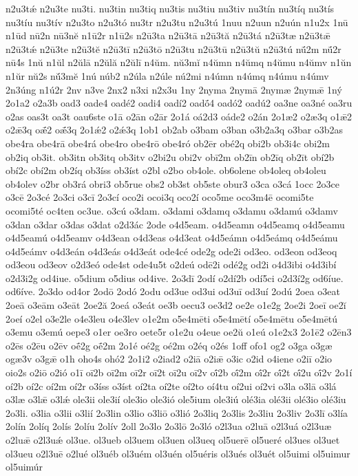 {n2u3tǽ
n2u3te
nu3ti.
nu3tin
nu3tiq
nu3tis
nu3tiu
nu3tiv
nu3tín
nu3tíq
nu3tís
nu3tíu
nu3tív
n2u3to
n2u3tó
nu3tr
n2u3tu
n2u3tú
1nuu
n2uun
n2uún
n1u2x
1nū
n1ūd
nū2n
nū3nĕ
n1ū2r
n1ū2s
n2ū3ta
n2ū3tā
n2ū3tă
n2ū3tá
n2ū3tæ
n2ū3tǣ
n2ū3tǽ
n2ū3te
n2ū3tĕ
n2ū3tī
n2ū3tō
n2ū3tu
n2ū3tū
n2ū3tŭ
n2ū3tú
nū́2m
nū́2r
nū4́s
1nŭ
n1ŭl
n2ŭlā
n2ŭlă
n2ŭlī
n4ŭm.
nŭ3mĭ
n4ŭmn
n4ŭmq
n4ŭmu
n4ŭmv
n1ŭn
n1ŭr
nŭ2s
nŭ́3mĕ
1nú
núb2
n2úla
n2úle
nú2mi
n4úmn
n4úmq
n4úmu
n4úmv
2n3úng
n1ú2r
2nv
n3ve
2nx2
n3xi
n2x3u
1ny
2nyma
2nymā
2nymæ
2nymǣ
1ný
2o1a2
o2a3b
oad3
oade4
oadé2
oadi4
oadí2
oadṓ4
oadó2
oadú2
oa3ne
oa3né
oa3ru
o2as
oas3t
oa3t
oau6ste
o1ā
o2ān
o2ār
2o1á
oá2d3
oáde2
o2án
2o1æ2
o2æ3q
o1ǣ2
o2ǣ3q
oǣ́2
oǣ́3q
2o1ǽ2
o2ǽ3q
1ob1
ob2ab
o3bam
o3ban
o3b2a3q
o3bar
o3b2as
obe4ra
obe4rā
obe4rá
obe4ro
obe4rō
obe4ró
ob2ēr
obé2q
obi2b
ob3i4c
obi2m
ob2iq
ob3it.
ob3itn
ob3itq
ob3itv
o2bi2u
obi2v
obī2m
ob2īn
ob2īq
ob2īt
obí2b
obí2c
obí2m
ob2íq
ob3íss
ob3íst
o2bl
o2bo
ob4ole.
ob6olene
ob4oleq
ob4oleu
ob4olev
o2br
ob3rá
obri3
ob5rue
obs2
ob3st
ob5ste
obur3
o3ca
o3cá
1occ
2o3ce
o3cē
2o3cé
2o3ci
o3cī
2o3cí
oco2i
ocoi3q
oco2í
oco5me
oco3m4ē
ocomi5te
ocomi5té
oc4ten
oc3ue.
o3cú
o3dam.
o3dami
o3damq
o3damu
o3damú
o3damv
o3dan
o3dar
o3das
o3dat
o2d3ác
2ode
o4d5eam.
o4d5eamn
o4d5eamq
o4d5eamu
o4d5eamú
o4d5eamv
o4d3ean
o4d3eas
o4d3eat
o4d5eámn
o4d5eámq
o4d5eámu
o4d5eámv
o4d3eán
o4d3eás
o4d3eát
ode4cé
ode2g
ode2i
od3eo.
od3eon
od3eoq
od3eou
od3eov
o2d3eó
ode4st
ode4u5t
o2deú
odē2i
odé2g
od2i
o4d3ibi
o4d3ibí
o2d3i2g
od4iue.
o5dium
o5dius
od4ive.
2o3dī
2odí
o2dí2b
odí5ci
o2d3í2g
od6íue.
od6íve.
2o3do
od4or
2odō
2odó
2odu
od3ue
od3ui
od3uī
od3uí
2odú
2oea
o3eat
2oeā
o3eām
o3eāt
2oe2ă
2oeá
o3eát
oe3b
oecu3
oe3d2
oe2e
o1e2g
2oe2i
2oeī
oe2ĭ
2oeí
o2el
o3e2le
o4e3leu
o4e3lev
o1e2m
o5e4mēti
o5e4mētí
o5e4mētu
o5e4mētú
o3emu
o3emú
oepe3
o1er
oe3ro
oete5r
o1e2u
o4eue
oe2ŭ
o1eú
o1e2x3
2o1ē2
o2ēn3
o2ēs
o2ēu
o2ēv
oḗ2g
oḗ2m
2o1é
oé2g
oé2m
o2éq
o2és
1off
ofo1
og2
o3ga
o3gæ
ogæ3v
o3gǣ
o1h
oho4s
ohó2
2o1i2
o2iad2
o2iā
o2iǣ
o3ic
o2id
o4iene
o2iī
o2io
oio2s
o2iō
o2ió
o1ī
oī2b
oī2m
oī2r
oī2t
oī2u
oī2v
oī́2b
oī́2m
oī́2r
oī́2t
oī́2u
oī́2v
2o1í
oí2b
oí2c
oí2m
oí2r
o3íss
o3íst
oí2ta
oí2te
oí2to
oí4tu
oí2ui
oí2vi
o3la
o3lā
o3lá
o3læ
o3lǣ
o3lǽ
ole3ii
ole3ií
ole3io
ole3ió
ole5ium
ole3iú
olé3ia
olé3ii
olé3io
olé3iu
2o3li.
o3lia
o3lii
o3lií
2o3lin
o3lio
o3liō
o3lió
2o3liq
2o3lis
2o3liu
2o3liv
2o3lī
o3lía
2olín
2olíq
2olís
2olíu
2olív
2oll
2o3lo
2o3lō
2o3ló
o2l3ua
o2luā
o2l3uá
o2l3uæ
o2luǣ
o2l3uǽ
ol3ue.
ol3ueb
ol3uem
ol3uen
ol3ueq
ol5uerē
ol5ueré
ol3ues
ol3uet
ol3ueu
o2l3uē
o2lué
ol3uéb
ol3uém
ol3uén
ol5uéris
ol3ués
ol3uét
ol5uimi
ol5uimur
ol5uimúr
}
